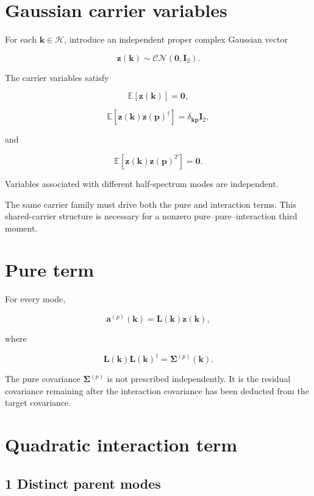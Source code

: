 \documentclass[
  11pt,
  a4paper,
]{article}
\begin{document}
\section{Gaussian carrier variables}\label{gaussian-carrier-variables}

For each \(\boldsymbol k\in\mathcal H\), introduce an independent proper
complex Gaussian vector

\[
\boldsymbol z(\boldsymbol k)\sim
\mathcal{CN}(\boldsymbol0,\boldsymbol I_2).
\]

The carrier variables satisfy

\[
\mathbb E[\boldsymbol z(\boldsymbol k)]
=
\boldsymbol0,
\]

\[
\mathbb E\!\left[
\boldsymbol z(\boldsymbol k)
\boldsymbol z(\boldsymbol p)^\dagger
\right]
=
\delta_{\boldsymbol k\boldsymbol p}\boldsymbol I_2,
\]

and

\[
\mathbb E\!\left[
\boldsymbol z(\boldsymbol k)
\boldsymbol z(\boldsymbol p)^T
\right]
=
\boldsymbol0.
\]

Variables associated with different half-spectrum modes are independent.

The same carrier family must drive both the pure and interaction terms.
This shared-carrier structure is necessary for a nonzero
pure--pure--interaction third moment.

\section{Pure term}\label{pure-term}

For every mode,

\[
\boldsymbol a^{(p)}(\boldsymbol k)
=
\boldsymbol L(\boldsymbol k)
\boldsymbol z(\boldsymbol k),
\]

where

\[
\boldsymbol L(\boldsymbol k)
\boldsymbol L(\boldsymbol k)^\dagger
=
\boldsymbol\Sigma^{(p)}(\boldsymbol k).
\]

The pure covariance \(\boldsymbol\Sigma^{(p)}\) is not prescribed
independently. It is the residual covariance remaining after the
interaction covariance has been deducted from the target covariance.

\section{Quadratic interaction term}\label{quadratic-interaction-term}

\subsection{1 Distinct parent modes}\label{distinct-parent-modes}
\end{document}
